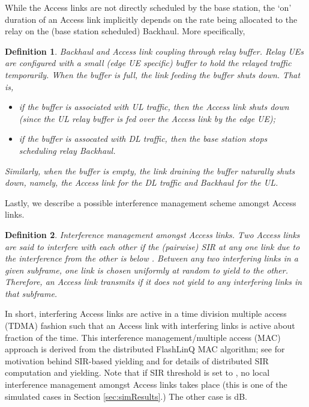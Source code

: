 \documentclass[journal]{IEEEtran}
\newtheorem{definit}{Definition}
\begin{document}
While the Access links are not directly scheduled by the base station, the `on' duration of an Access link implicitly depends on the rate being allocated to the relay on the (base station scheduled) Backhaul. More specifically,
\begin{definit}
    {\em Backhaul and Access link coupling through relay buffer.} Relay UEs are configured with a small (edge UE specific) buffer to hold the relayed traffic temporarily.  When the buffer is full, the link feeding the buffer shuts down.  That is,
    \begin{itemize}
        \item if the buffer is associated with UL traffic, then the Access link shuts down (since the UL relay buffer is fed over the Access link by the edge UE);
        \item if the buffer is assocated with DL traffic, then the base station stops scheduling relay Backhaul.
    \end{itemize}
    Similarly, when the buffer is empty, the link draining the buffer naturally shuts down, namely, the Access link for the DL traffic and Backhaul for the UL.
\end{definit}

Lastly, we describe a possible interference management scheme amongst Access links.
\begin{definit}
	{\em Interference management amongst Access links.}  Two Access links are said to interfere with each other if the (pairwise) SIR at any one link due to the interference from the other is below .  Between any two interfering links in a given subframe, one link is chosen uniformly at random to yield to the other.  Therefore, an Access link transmits if it does not yield to any interfering links in that subframe.
\end{definit}

In short, interfering Access links are active in a time division multiple access (TDMA) fashion such that an Access link with  interfering links is active about  fraction of the time. This interference management/multiple access (MAC) approach is derived from the distributed FlashLinQ MAC algorithm; see \cite[Sec.~I-A]{WuTavildarShakkottai10} for motivation behind SIR-based yielding and \cite[Sec.~III]{WuTavildarShakkottai10} for details of distributed SIR computation and yielding.
Note that if SIR threshold  is set to , no local interference management amongst Access links takes place (this is one of the simulated cases in Section \ref{sec:simResults}.)  The other case is dB.
\end{document}
